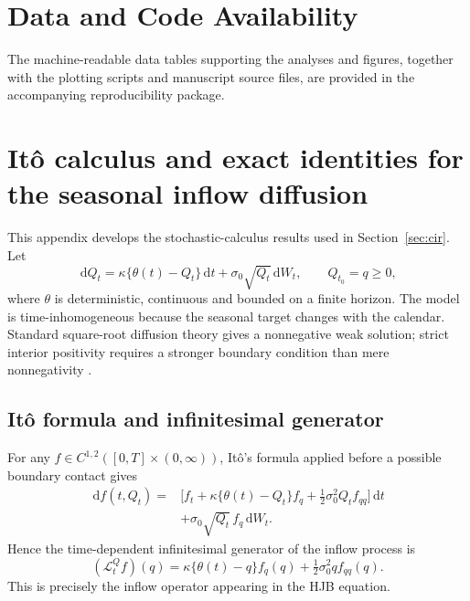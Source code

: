 \documentclass[11pt,a4paper]{article}
\newcommand{\dif}{\,\mathrm{d}}
\begin{document}
\section*{Data and Code Availability}
The machine-readable data tables supporting the analyses and figures, together with
the plotting scripts and manuscript source files, are provided in the accompanying
reproducibility package.

\appendix
\section{It\^o calculus and exact identities for the seasonal inflow diffusion}
\label{app:ito}
This appendix develops the stochastic-calculus results used in
Section~\ref{sec:cir}. Let
\begin{equation}
 \dif Q_t=\kappa\{\theta(t)-Q_t\}\dif t+\sigma_0\sqrt{Q_t}\dif W_t,
 \qquad Q_{t_0}=q\ge0,
 \label{eq:app-cir}
\end{equation}
where $\theta$ is deterministic, continuous and bounded on a finite horizon.
The model is time-inhomogeneous because the seasonal target changes with the
calendar. Standard square-root diffusion theory gives a nonnegative weak solution;
strict interior positivity requires a stronger boundary condition than mere
nonnegativity \cite{cir1985,feller1951}.

\subsection{It\^o formula and infinitesimal generator}
For any $f\in C^{1,2}([0,T]\times(0,\infty))$, It\^o's formula applied before a
possible boundary contact gives
\begin{align}
 \dif f(t,Q_t)=&\Big[f_t+\kappa\{\theta(t)-Q_t\}f_q
 +\tfrac12\sigma_0^2Q_t f_{qq}\Big]\dif t \\
 &+\sigma_0\sqrt{Q_t}\,f_q\dif W_t.
 \label{eq:app-ito-general}
\end{align}
Hence the time-dependent infinitesimal generator of the inflow process is
\begin{equation}
 (\mathcal L_t^Q f)(q)=\kappa\{\theta(t)-q\}f_q(q)
 +\tfrac12\sigma_0^2q f_{qq}(q).
 \label{eq:app-generator}
\end{equation}
This is precisely the inflow operator appearing in the HJB equation.
\end{document}
